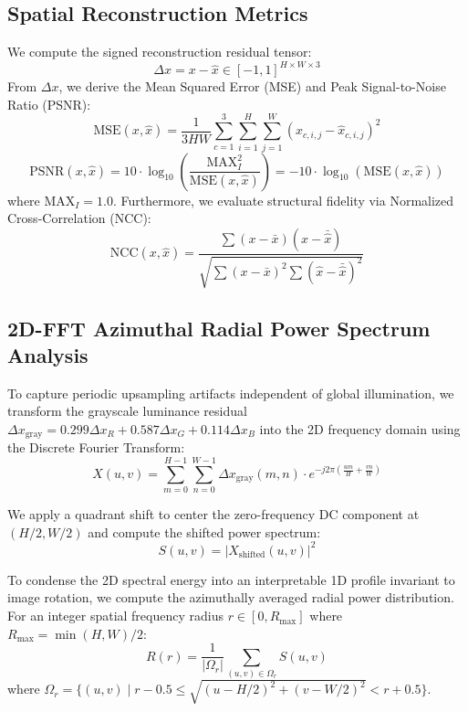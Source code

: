 \documentclass[conference]{IEEEtran}
\theoremstyle{definition}
\begin{document}
\subsection{Spatial Reconstruction Metrics}
We compute the signed reconstruction residual tensor:
\begin{equation}
\Delta x = x - \hat{x} \in [-1, 1]^{H \times W \times 3}
\end{equation}
From $\Delta x$, we derive the Mean Squared Error (MSE) and Peak Signal-to-Noise Ratio (PSNR):
\begin{equation}
\text{MSE}(x, \hat{x}) = \frac{1}{3 H W} \sum_{c=1}^3 \sum_{i=1}^H \sum_{j=1}^W \left( x_{c, i, j} - \hat{x}_{c, i, j} \right)^2
\end{equation}
\begin{equation}
\text{PSNR}(x, \hat{x}) = 10 \cdot \log_{10}\left( \frac{\text{MAX}_I^2}{\text{MSE}(x, \hat{x})} \right) = -10 \cdot \log_{10}\left(\text{MSE}(x, \hat{x})\right)
\end{equation}
where $\text{MAX}_I = 1.0$. Furthermore, we evaluate structural fidelity via Normalized Cross-Correlation (NCC):
\begin{equation}
\text{NCC}(x, \hat{x}) = \frac{\sum (x - \bar{x})(\hat{x} - \bar{\hat{x}})}{\sqrt{\sum (x - \bar{x})^2 \sum (\hat{x} - \bar{\hat{x}})^2}}
\end{equation}

\subsection{2D-FFT Azimuthal Radial Power Spectrum Analysis}
To capture periodic upsampling artifacts independent of global illumination, we transform the grayscale luminance residual $\Delta x_{\text{gray}} = 0.299 \Delta x_R + 0.587 \Delta x_G + 0.114 \Delta x_B$ into the 2D frequency domain using the Discrete Fourier Transform:
\begin{equation}
X(u, v) = \sum_{m=0}^{H-1} \sum_{n=0}^{W-1} \Delta x_{\text{gray}}(m, n) \cdot e^{-j 2\pi \left( \frac{u m}{H} + \frac{v n}{W} \right)}
\end{equation}

We apply a quadrant shift to center the zero-frequency DC component at $(H/2, W/2)$ and compute the shifted power spectrum:
\begin{equation}
S(u, v) = |X_{\text{shifted}}(u, v)|^2
\end{equation}

To condense the 2D spectral energy into an interpretable 1D profile invariant to image rotation, we compute the azimuthally averaged radial power distribution. For an integer spatial frequency radius $r \in [0, R_{\max}]$ where $R_{\max} = \min(H, W)/2$:
\begin{equation}
R(r) = \frac{1}{|\Omega_r|} \sum_{(u, v) \in \Omega_r} S(u, v)
\end{equation}
where $\Omega_r = \{ (u, v) \mid r - 0.5 \le \sqrt{(u - H/2)^2 + (v - W/2)^2} < r + 0.5 \}$.
\end{document}
